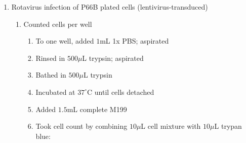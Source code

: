 \begin{enumerate}
	\item Rotavirus infection of P66B plated cells (lentivirus-transduced)
		\begin{enumerate}
			\item Counted cells per well
				\begin{enumerate}
					\item To one well, added $1$mL 1x PBS; aspirated
					\item Rinsed in $500\mu$L trypsin; aspirated
					\item Bathed in $500\mu$L trypsin
					\item Incubated at $37^{\circ}$C until cells detached
					\item Added $1.5$mL complete M199
					\item Took cell count by combining $10\mu$L cell mixture with $10\mu$L trypan blue:
			

\end{enumerate}
\end{enumerate}
\end{enumerate}
